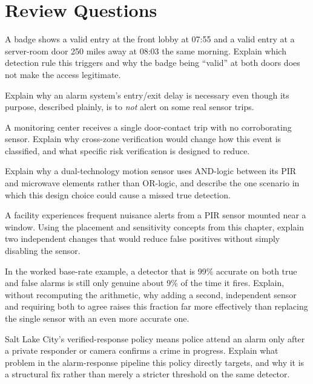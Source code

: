 \section*{Review Questions}
\begin{reviewquestions}
\item A badge shows a valid entry at the front lobby at 07:55 and a valid entry at a server-room
door 250 miles away at 08:03 the same morning. Explain which detection rule this triggers and why
the badge being ``valid'' at both doors does not make the access legitimate.
\item Explain why an alarm system's entry/exit delay is necessary even though its purpose,
described plainly, is to \emph{not} alert on some real sensor trips.
\item A monitoring center receives a single door-contact trip with no corroborating sensor. Explain
why cross-zone verification would change how this event is classified, and what specific risk
verification is designed to reduce.
\item Explain why a dual-technology motion sensor uses AND-logic between its PIR and microwave
elements rather than OR-logic, and describe the one scenario in which this design choice could
cause a missed true detection.
\item A facility experiences frequent nuisance alerts from a PIR sensor mounted near a window.
Using the placement and sensitivity concepts from this chapter, explain two independent changes
that would reduce false positives without simply disabling the sensor.
\item In the worked base-rate example, a detector that is 99\% accurate on both true and false
alarms is still only genuine about 9\% of the time it fires. Explain, without recomputing the
arithmetic, why adding a second, independent sensor and requiring both to agree raises this
fraction far more effectively than replacing the single sensor with an even more accurate one.
\item Salt Lake City's verified-response policy means police attend an alarm only after a private
responder or camera confirms a crime in progress. Explain what problem in the alarm-response
pipeline this policy directly targets, and why it is a structural fix rather than merely a stricter
threshold on the same detector.
\end{reviewquestions}


